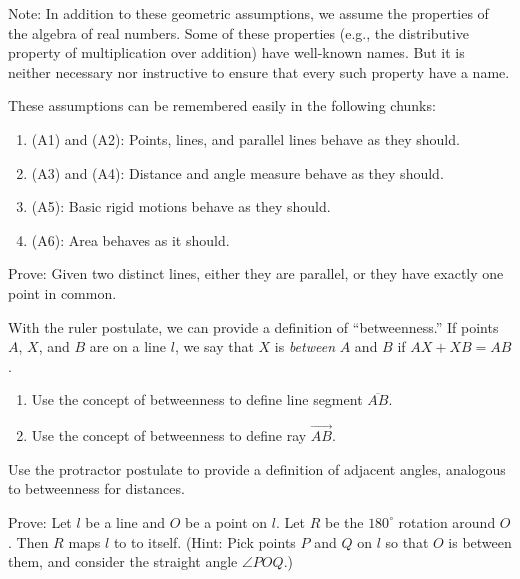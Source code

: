 Note:  In addition to these geometric assumptions, we assume the properties of the algebra of real numbers.  
Some of these properties (e.g., the distributive property of multiplication over addition) have well-known names.  But it is neither necessary nor instructive to ensure that every such property have a name.  

These assumptions can be remembered easily in the following chunks:  
\begin{enumerate}
\item (A1) and (A2):  Points, lines, and parallel lines behave as they should. 
\item (A3) and (A4):  Distance and angle measure behave as they should. 
\item (A5):  Basic rigid motions behave as they should.
\item (A6):  Area behaves as it should.  
\end{enumerate}

\begin{prob}
Prove:  Given two distinct lines, either they are parallel, or they have exactly one
point in common.  
\end{prob}


\begin{prob}
With the ruler postulate, we can provide a definition of ``betweenness.''  If points $A$, $X$, and $B$ are on a line $l$, we say that $X$ is \emph{between} $A$ and $B$ if $AX + XB = AB$. 
\begin{enumerate}
\item Use the concept of betweenness to define line segment $\overline{AB}$.  
\item Use the concept of betweenness to define ray $\overrightarrow{AB}$. 
\end{enumerate}
\end{prob}

\begin{prob}
Use the protractor postulate to provide a definition of adjacent angles, analogous to betweenness for distances.  
\end{prob}

\begin{prob}
Prove:  Let $l$ be a line and $O$ be a point on $l$. Let $R$ be the $180^\circ$
rotation around $O$. Then $R$ maps $l$ to to itself.  (Hint:  Pick points $P$ and $Q$ on $l$ so that $O$ is between them, and consider the straight angle $\angle POQ$.)
\end{prob}

